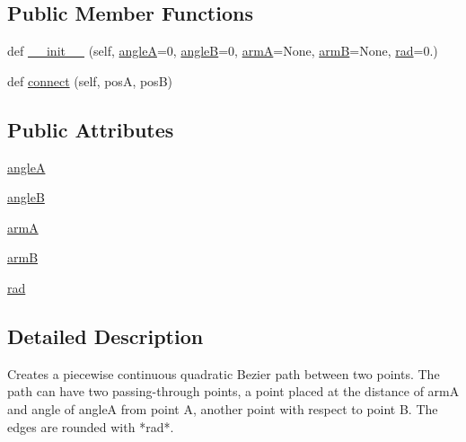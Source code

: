 \subsection*{Public Member Functions}
\begin{DoxyCompactItemize}
\item 
def \hyperlink{classmatplotlib_1_1patches_1_1ConnectionStyle_1_1Arc_aa366f05682a081b086bf60aa2324d650}{\+\_\+\+\_\+init\+\_\+\+\_\+} (self, \hyperlink{classmatplotlib_1_1patches_1_1ConnectionStyle_1_1Arc_a9ed57d3106eef69d75b187752ec08907}{angleA}=0, \hyperlink{classmatplotlib_1_1patches_1_1ConnectionStyle_1_1Arc_a64c73f85c05def09a615722fd26fae1a}{angleB}=0, \hyperlink{classmatplotlib_1_1patches_1_1ConnectionStyle_1_1Arc_ae1229f961ef32331231743a6e47733ae}{armA}=None, \hyperlink{classmatplotlib_1_1patches_1_1ConnectionStyle_1_1Arc_ae0f74329726bc8e932e1327bd1b6fc3a}{armB}=None, \hyperlink{classmatplotlib_1_1patches_1_1ConnectionStyle_1_1Arc_a715ca23cb0517ea522f554a44d526693}{rad}=0.)
\item 
def \hyperlink{classmatplotlib_1_1patches_1_1ConnectionStyle_1_1Arc_af871902f733e959471c09cf3e5b81bdb}{connect} (self, posA, posB)
\end{DoxyCompactItemize}
\subsection*{Public Attributes}
\begin{DoxyCompactItemize}
\item 
\hyperlink{classmatplotlib_1_1patches_1_1ConnectionStyle_1_1Arc_a9ed57d3106eef69d75b187752ec08907}{angleA}
\item 
\hyperlink{classmatplotlib_1_1patches_1_1ConnectionStyle_1_1Arc_a64c73f85c05def09a615722fd26fae1a}{angleB}
\item 
\hyperlink{classmatplotlib_1_1patches_1_1ConnectionStyle_1_1Arc_ae1229f961ef32331231743a6e47733ae}{armA}
\item 
\hyperlink{classmatplotlib_1_1patches_1_1ConnectionStyle_1_1Arc_ae0f74329726bc8e932e1327bd1b6fc3a}{armB}
\item 
\hyperlink{classmatplotlib_1_1patches_1_1ConnectionStyle_1_1Arc_a715ca23cb0517ea522f554a44d526693}{rad}
\end{DoxyCompactItemize}


\subsection{Detailed Description}
\begin{DoxyVerb}Creates a piecewise continuous quadratic Bezier path between
two points. The path can have two passing-through points, a
point placed at the distance of armA and angle of angleA from
point A, another point with respect to point B. The edges are
rounded with *rad*.
\end{DoxyVerb}
 

